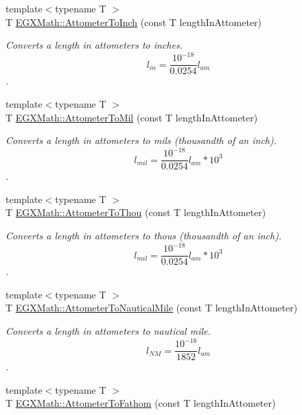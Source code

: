 \begin{DoxyCompactItemize}
{\footnotesize template$<$typename T $>$ }\\T \mbox{\hyperlink{group___e_g_x_math-_conversions-_length_conversions-_s_i-_attometer-_imperial_ga76cb652df52a89284cc3661a670d4990}{E\+G\+X\+Math\+::\+Attometer\+To\+Inch}} (const T length\+In\+Attometer)
\begin{DoxyCompactList}\small\item\em Converts a length in attometers to inches. \[ l_{in}= \frac{10^{-18}}{0.0254} l_{am} \]. \end{DoxyCompactList}\item 
{\footnotesize template$<$typename T $>$ }\\T \mbox{\hyperlink{group___e_g_x_math-_conversions-_length_conversions-_s_i-_attometer-_imperial_ga1ad78989a93e5316f787a6412e2c8e3a}{E\+G\+X\+Math\+::\+Attometer\+To\+Mil}} (const T length\+In\+Attometer)
\begin{DoxyCompactList}\small\item\em Converts a length in attometers to mils (thousandth of an inch). \[ l_{mil}= \frac{10^{-18}}{0.0254} l_{am} * 10^{3} \]. \end{DoxyCompactList}\item 
{\footnotesize template$<$typename T $>$ }\\T \mbox{\hyperlink{group___e_g_x_math-_conversions-_length_conversions-_s_i-_attometer-_imperial_gac9c9742b80b24da4e531fbcdc39976bb}{E\+G\+X\+Math\+::\+Attometer\+To\+Thou}} (const T length\+In\+Attometer)
\begin{DoxyCompactList}\small\item\em Converts a length in attometers to thous (thousandth of an inch). \[ l_{mil}= \frac{10^{-18}}{0.0254} l_{am} * 10^{3} \]. \end{DoxyCompactList}\item 
{\footnotesize template$<$typename T $>$ }\\T \mbox{\hyperlink{group___e_g_x_math-_conversions-_length_conversions-_s_i-_attometer-_nautical_ga38f0b72d347141e8740bcf9d84a08d25}{E\+G\+X\+Math\+::\+Attometer\+To\+Nautical\+Mile}} (const T length\+In\+Attometer)
\begin{DoxyCompactList}\small\item\em Converts a length in attometers to nautical mile. \[ l_{NM}= \frac{10^{-18}}{1852} l_{am} \]. \end{DoxyCompactList}\item 
{\footnotesize template$<$typename T $>$ }\\T \mbox{\hyperlink{group___e_g_x_math-_conversions-_length_conversions-_s_i-_attometer-_nautical_ga969bc018e3f734e6c4012502d9c6c801}{E\+G\+X\+Math\+::\+Attometer\+To\+Fathom}} (const T length\+In\+Attometer)

\end{DoxyCompactItemize}
